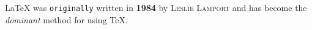\documentclass{article}
\begin{document}
\LaTeX{} was \texttt{originally} written in \textbf{1984} 
by \textsc{Leslie Lamport} and has become the 
\textit{dominant} method for using \TeX.
\end{document}
